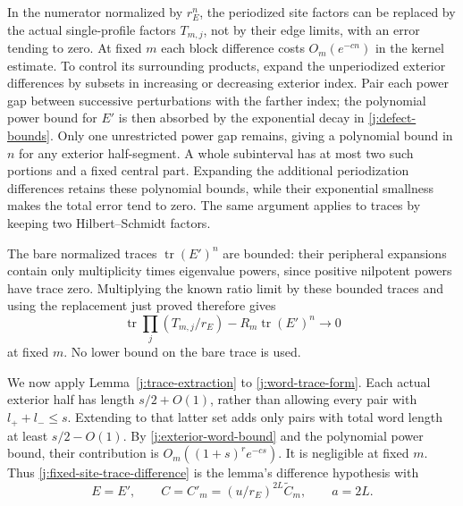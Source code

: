 In the numerator normalized by $r_E^n$, the periodized site factors can
be replaced by the actual single-profile factors $T_{m,j}$, not by their
edge limits, with an error tending to zero. At fixed $m$ each block
difference costs $O_m(e^{-cn})$ in the kernel estimate. To control its
surrounding products, expand the unperiodized exterior differences by
subsets in increasing or decreasing exterior index. Pair each power gap
between successive perturbations with the farther index; the polynomial
power bound for $E'$ is then absorbed by the exponential decay in
\eqref{j:defect-bounds}. Only one unrestricted power gap remains, giving
a polynomial bound in $n$ for any exterior half-segment. A whole
subinterval has at most two such portions and a fixed central part.
Expanding the additional periodization differences retains these
polynomial bounds, while their exponential smallness makes the total
error tend to zero. The same argument applies to traces by keeping two
Hilbert--Schmidt factors.

The bare normalized traces $\operatorname{tr}(E')^n$ are bounded: their
peripheral expansions contain only multiplicity times eigenvalue powers,
since positive nilpotent powers have trace zero. Multiplying the known
ratio limit by these bounded traces and using the replacement just proved
therefore gives
\begin{equation}\label{j:fixed-site-trace-difference}
 \operatorname{tr}\prod_j(T_{m,j}/r_E)
       -R_m\operatorname{tr}(E')^n\longrightarrow0
\end{equation}
at fixed $m$. No lower bound on the bare trace is used.

We now apply Lemma~\ref{j:trace-extraction} to
\eqref{j:word-trace-form}. Each actual exterior half has length
$s/2+O(1)$, rather than allowing every pair with $l_++l_-\le s$.
Extending to that latter set adds only pairs with total word length at
least $s/2-O(1)$. By \eqref{j:exterior-word-bound} and the polynomial
power bound, their contribution is $O_m((1+s)^r e^{-cs})$. It is
negligible at fixed $m$. Thus \eqref{j:fixed-site-trace-difference}
is the lemma's difference hypothesis with
\[
 E=E',\qquad C=C'_m=(u/r_E)^{2L}\widetilde C_m,
 \qquad a=2L.
\]

